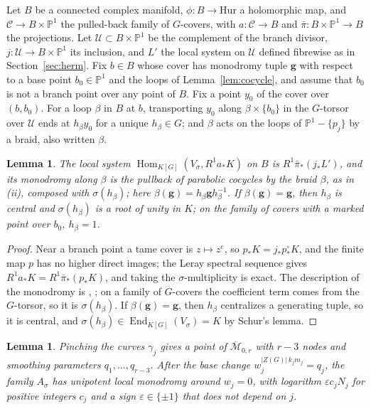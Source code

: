 \documentclass[11pt]{amsart}
\newtheorem{lemma}[theorem]{Lemma}
\theoremstyle{definition}
\theoremstyle{remark}
\newcommand{\PP}{\mathbb P}
\newcommand{\End}{\operatorname{End}}
\newcommand{\Hom}{\operatorname{Hom}}
\begin{document}
Let $B$ be a connected complex manifold, $\phi\colon B\to\mathrm{Hur}$ a holomorphic map, and $\mathcal C\to B\times\PP^1$ the pulled-back family of $G$-covers, with $a\colon\mathcal C\to B$ and $\bar\pi\colon B\times\PP^1\to B$ the projections. Let $\mathcal U\subset B\times\PP^1$ be the complement of the branch divisor, $j\colon\mathcal U\to B\times\PP^1$ its inclusion, and $L'$ the local system on $\mathcal U$ defined fibrewise as in Section~\ref{sec:herm}. Fix $b\in B$ whose cover has monodromy tuple $\mathbf g$ with respect to a base point $b_0\in\PP^1$ and the loops of Lemma~\ref{lem:cocycle}, and assume that $b_0$ is not a branch point over any point of $B$. Fix a point $y_0$ of the cover over $(b,b_0)$. For a loop $\beta$ in $B$ at $b$, transporting $y_0$ along $\beta\times\{b_0\}$ in the $G$-torsor over $\mathcal U$ ends at $h_\beta y_0$ for a unique $h_\beta\in G$; and $\beta$ acts on the loops of $\PP^1-\{p_j\}$ by a braid, also written $\beta$.

\begin{lemma}\label{lem:gm}
The local system $\Hom_{K[G]}(V_\sigma,R^1a_*K)$ on $B$ is $R^1\bar\pi_*(j_*L')$, and its monodromy along $\beta$ is the pullback of parabolic cocycles by the braid $\beta$, as in (ii), composed with $\sigma(h_\beta)$; here $\beta(\mathbf g)=h_\beta\mathbf gh_\beta^{-1}$. If $\beta(\mathbf g)=\mathbf g$, then $h_\beta$ is central and $\sigma(h_\beta)$ is a root of unity in $K$; on the family of covers with a marked point over $b_0$, $h_\beta=1$.
\end{lemma}

\begin{proof}
Near a branch point a tame cover is $z\mapsto z^e$, so $p_*K=j_*p^\circ_*K$, and the finite map $p$ has no higher direct images; the Leray spectral sequence gives $R^1a_*K=R^1\bar\pi_*(p_*K)$, and taking the $\sigma$-multiplicity is exact. The description of the monodromy is \cite[Lemma~2.2 and Theorem~2.5]{DW1}, \cite[Theorem~1.3]{DW2}; on a family of $G$-covers the coefficient term comes from the $G$-torsor, so it is $\sigma(h_\beta)$. If $\beta(\mathbf g)=\mathbf g$, then $h_\beta$ centralizes a generating tuple, so it is central, and $\sigma(h_\beta)\in\End_{K[G]}(V_\sigma)=K$ by Schur's lemma.
\end{proof}

\begin{lemma}\label{lem:localmon}
Pinching the curves $\gamma_j$ gives a point of $\overline{\mathcal M}_{0,r}$ with $r-3$ nodes and smoothing parameters $q_1,\dots,q_{r-3}$. After the base change $w_j^{|Z(G)|\,k_jm_j}=q_j$, the family $A_\sigma$ has unipotent local monodromy around $w_j=0$, with logarithm $\varepsilon c_jN_j$ for positive integers $c_j$ and a sign $\varepsilon\in\{\pm1\}$ that does not depend on $j$.
\end{lemma}
\end{document}
